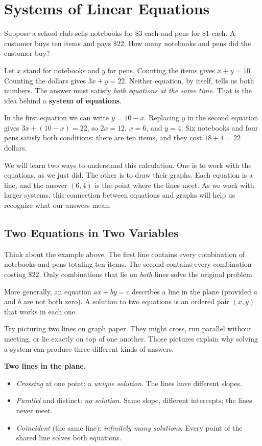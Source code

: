 \documentclass[12pt]{book}
\begin{document}
\chapter{Systems of Linear Equations}

Suppose a school club sells notebooks for $\$3$ each and pens for $\$1$ each.
A customer buys ten items and pays $\$22$. How many notebooks and pens did
the customer buy?

Let $x$ stand for notebooks and $y$ for pens. Counting the items gives
$x+y=10$. Counting the dollars gives $3x+y=22$. Neither equation, by
itself, tells us both numbers. The answer must satisfy \emph{both equations
at the same time}. That is the idea behind a \textbf{system of equations}.

In the first equation we can write $y=10-x$. Replacing $y$ in the second
equation gives $3x+(10-x)=22$, so $2x=12$, $x=6$, and $y=4$.
Six notebooks and four pens satisfy both conditions: there are ten items,
and they cost $18+4=22$ dollars.

We will learn two ways to understand this calculation. One is to work with
the equations, as we just did. The other is to draw their graphs. Each
equation is a line, and the answer $(6,4)$ is the point where the lines
meet. As we work with larger systems, this connection between equations
and graphs will help us recognize what our answers mean.


\section{Two Equations in Two Variables}

Think about the example above. The first line contains every combination
of notebooks and pens totaling ten items. The second contains every
combination costing $\$22$. Only combinations that lie on \emph{both} lines
solve the original problem.

More generally, an equation $ax+by=c$ describes a line in the plane
(provided $a$ and $b$ are not both zero). A solution to two equations is
an ordered pair $(x,y)$ that works in each one.

Try picturing two lines on graph paper. They might cross, run parallel
without meeting, or lie exactly on top of one another. Those pictures
explain why solving a system can produce three different kinds of answers.


\begin{keyidea}
\textbf{Two lines in the plane.}
\begin{itemize}\setlength{\itemsep}{2pt}
  \item \emph{Crossing} at one point: a \emph{unique solution}. The lines have
        different slopes.
  \item \emph{Parallel} and distinct: \emph{no solution}. Same slope, different
        intercepts; the lines never meet.
  \item \emph{Coincident} (the same line): \emph{infinitely many solutions}. Every
        point of the shared line solves both equations.
\end{itemize}
\end{keyidea}
\end{document}
